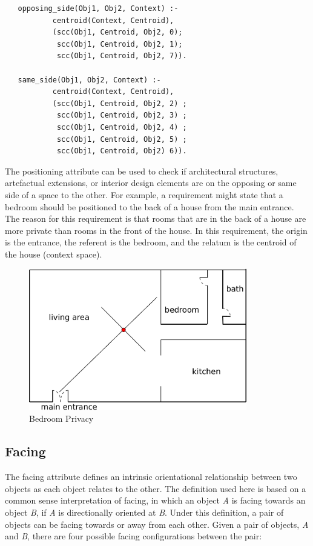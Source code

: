 \documentclass[12pt]{ucthesis}
\begin{document}
\begin{verbatim}
   opposing_side(Obj1, Obj2, Context) :- 
           centroid(Context, Centroid),
           (scc(Obj1, Centroid, Obj2, 0);
            scc(Obj1, Centroid, Obj2, 1);
            scc(Obj1, Centroid, Obj2, 7)).
                                          
   same_side(Obj1, Obj2, Context) :- 
           centroid(Context, Centroid),
           (scc(Obj1, Centroid, Obj2, 2) ;
            scc(Obj1, Centroid, Obj2, 3) ;
            scc(Obj1, Centroid, Obj2, 4) ;
            scc(Obj1, Centroid, Obj2, 5) ;
            scc(Obj1, Centroid, Obj2) 6)).   

\end{verbatim}

The positioning attribute can be used to check if architectural structures, artefactual extensions, or interior design elements are on the opposing or same side of a space to the other. For example, a requirement might state that a bedroom should be positioned to the back of a house from the main entrance. The reason for this requirement is that rooms that are in the back of a house are more private than rooms in the front of the house. In this requirement, the origin is the entrance, the referent is the bedroom, and the relatum is the centroid of the house (context space).

\begin{figure}[H]
 \centering
 \includegraphics[width=95mm]{bedroom-back-house}
 \caption{Bedroom Privacy}
\label{privacy}
\end{figure}


\subsection{Facing}
The facing attribute defines an intrinsic orientational relationship between two objects as each object relates to the other. The definition used here is based on a common sense interpretation of facing, in which an object \emph{A} is facing towards an object \emph{B}, if \emph{A} is directionally oriented at \emph{B}. Under this definition, a pair of objects can be facing towards or away from each other. Given a pair of objects, \emph{A} and \emph{B}, there are four possible facing configurations between the pair: 
\end{document}

